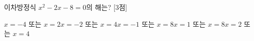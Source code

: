 이차방정식 $x^2-2x-8=0$의 해는? \mbox{[3점]}
\begin{choicesii}{$x=-4$ 또는 $x=2$}{$x=-2$ 또는 $x=4$}{$x=-1$ 또는 $x=8$}{$x=1$ 또는 $x=8$}{$x=2$ 또는 $x=4$}\end{choicesii}
